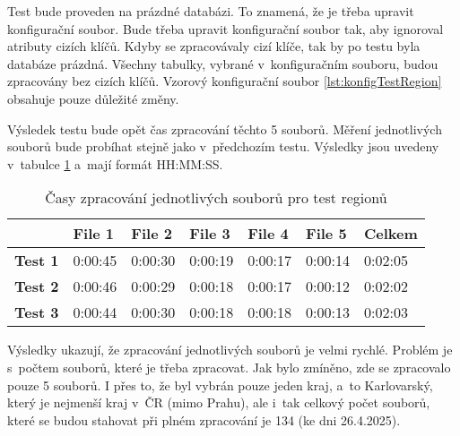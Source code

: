 Test bude proveden na prázdné databázi. To znamená, že je třeba upravit konfigurační soubor.
Bude třeba upravit konfigurační soubor tak, aby ignoroval atributy cizích klíčů.
Kdyby se zpracovávaly cizí klíče, tak by po testu byla databáze prázdná.
Všechny tabulky, vybrané v~konfiguračním souboru, budou zpracovány bez cizích klíčů.
Vzorový konfigurační soubor \ref{lst:konfigTestRegion} obsahuje pouze důležité změny.

Výsledek testu bude opět čas zpracování těchto 5 souborů.
Měření jednotlivých souborů bude probíhat stejně jako v~předchozím testu.
Výsledky jsou uvedeny v~tabulce \ref{tab:test2} a~mají formát HH:MM:SS.

\begin{table}[!h]
  \centering
  \caption{Časy zpracování jednotlivých souborů pro test regionů}
  \label{tab:test2}
  \begin{tabular}{|l|l|l|l|l|l|l|}
  \hline
                  & \textbf{File 1} & \textbf{File 2} & \textbf{File 3} & \textbf{File 4} & \textbf{File 5} & \textbf{Celkem} \\ \hline
  \textbf{Test 1} & 0:00:45         & 0:00:30         & 0:00:19         & 0:00:17         & 0:00:14         & 0:02:05         \\ \hline
  \textbf{Test 2} & 0:00:46         & 0:00:29         & 0:00:18         & 0:00:17         & 0:00:12         & 0:02:02         \\ \hline
  \textbf{Test 3} & 0:00:44         & 0:00:30         & 0:00:18         & 0:00:18         & 0:00:13         & 0:02:03         \\ \hline
  \end{tabular}
\end{table}

Výsledky ukazují, že zpracování jednotlivých souborů je velmi rychlé.
Problém je s~počtem souborů, které je třeba zpracovat. Jak bylo zmíněno,
zde se zpracovalo pouze 5 souborů. I přes to, že byl vybrán pouze jeden kraj,
a~to Karlovarský, který je nejmenší kraj v~ČR (mimo Prahu), ale i~tak celkový počet souborů,
které se budou stahovat při plném zpracování je 134 (ke dni 26.4.2025).

\newpage

